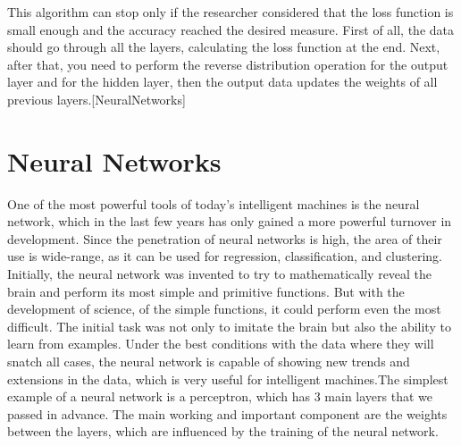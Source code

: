 \par This algorithm can stop only if the researcher considered that the loss function is small enough and the accuracy reached the desired measure. First of all, the data should go through all the layers, calculating the loss function at the end. Next, after that, you need to perform the reverse distribution operation for the output layer and for the hidden layer, then the output data updates the weights of all previous layers.[NeuralNetworks]


\section{Neural Networks}\label{sec:3.8}
\par One of the most powerful tools of today's intelligent machines is the neural network, which in the last few years has only gained a more powerful turnover in development. Since the penetration of neural networks is high, the area of their use is wide-range, as it can be used for regression, classification, and clustering. Initially, the neural network was invented to try to mathematically reveal the brain and perform its most simple and primitive functions. But with the development of science, of the simple functions, it could perform even the most difficult. The initial task was not only to imitate the brain but also the ability to learn from examples. Under the best conditions with the data where they will snatch all cases, the neural network is capable of showing new trends and extensions in the data, which is very useful for intelligent machines.The simplest example of a neural network is a perceptron, which has 3 main layers that we passed in advance. The main working and important component are the weights between the layers, which are influenced by the training of the neural network.
